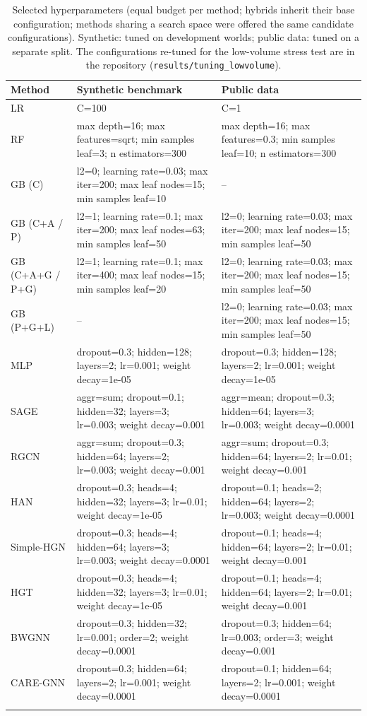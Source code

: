 \begin{table}[h]
\caption{Selected hyperparameters (equal budget per method; hybrids inherit their base configuration; methods sharing a search space were offered the same candidate configurations). Synthetic: tuned on development worlds; public data: tuned on a separate split. The configurations re-tuned for the low-volume stress test are in the repository (\texttt{results/tuning\_lowvolume}).}\label{tab:hyperparams}
\scriptsize
\begin{tabular}{@{}p{2.2cm}p{5.0cm}p{5.0cm}@{}}
\toprule
Method & Synthetic benchmark & Public data \\
\midrule
LR & C=100 & C=1 \\
RF & max depth=16; max features=sqrt; min samples leaf=3; n estimators=300 & max depth=16; max features=0.3; min samples leaf=10; n estimators=300 \\
GB (C) & l2=0; learning rate=0.03; max iter=200; max leaf nodes=15; min samples leaf=10 & -- \\
GB (C+A / P) & l2=1; learning rate=0.1; max iter=200; max leaf nodes=63; min samples leaf=50 & l2=0; learning rate=0.03; max iter=200; max leaf nodes=15; min samples leaf=50 \\
GB (C+A+G / P+G) & l2=1; learning rate=0.1; max iter=400; max leaf nodes=15; min samples leaf=20 & l2=0; learning rate=0.03; max iter=200; max leaf nodes=15; min samples leaf=50 \\
GB (P+G+L) & -- & l2=0; learning rate=0.03; max iter=200; max leaf nodes=15; min samples leaf=50 \\
MLP & dropout=0.3; hidden=128; layers=2; lr=0.001; weight decay=1e-05 & dropout=0.3; hidden=128; layers=2; lr=0.001; weight decay=1e-05 \\
SAGE & aggr=sum; dropout=0.1; hidden=32; layers=3; lr=0.003; weight decay=0.001 & aggr=mean; dropout=0.3; hidden=64; layers=3; lr=0.003; weight decay=0.0001 \\
RGCN & aggr=sum; dropout=0.3; hidden=64; layers=2; lr=0.003; weight decay=0.001 & aggr=sum; dropout=0.3; hidden=64; layers=2; lr=0.01; weight decay=0.001 \\
HAN & dropout=0.3; heads=4; hidden=32; layers=3; lr=0.01; weight decay=1e-05 & dropout=0.1; heads=2; hidden=64; layers=2; lr=0.003; weight decay=0.0001 \\
Simple-HGN & dropout=0.3; heads=4; hidden=64; layers=3; lr=0.003; weight decay=0.0001 & dropout=0.1; heads=4; hidden=64; layers=2; lr=0.01; weight decay=0.001 \\
HGT & dropout=0.3; heads=4; hidden=32; layers=3; lr=0.01; weight decay=1e-05 & dropout=0.1; heads=4; hidden=64; layers=2; lr=0.01; weight decay=0.001 \\
BWGNN & dropout=0.3; hidden=32; lr=0.001; order=2; weight decay=0.0001 & dropout=0.3; hidden=64; lr=0.003; order=3; weight decay=0.001 \\
CARE-GNN & dropout=0.3; hidden=64; layers=2; lr=0.001; weight decay=0.0001 & dropout=0.1; hidden=64; layers=2; lr=0.001; weight decay=0.0001 \\
\botrule
\end{tabular}
\end{table}